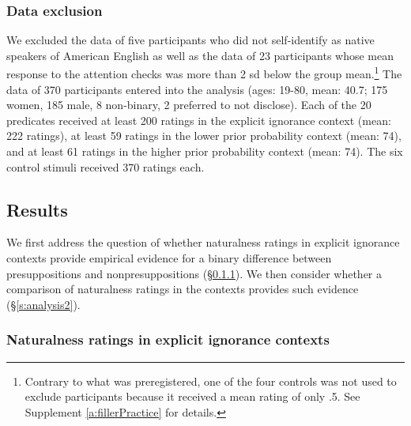 \documentclass[11pt,fleqn]{article}
\newcommand{\6}{\mbox{$[\hspace*{-.6mm}[$}}
\newcommand{\9}{\mbox{$]\hspace*{-.6mm}]$}}
\begin{document}
\subsubsection{Data exclusion} 

We excluded the data of five participants who did not self-identify as native speakers of American English as well as the data of 23 participants whose mean response to the attention checks was more than 2 sd below the group mean.\footnote{Contrary to what was preregistered, one of the four controls was not used to exclude participants because it received a mean rating of only .5. See Supplement \ref{a:fillerPractice} for details.} The data of 370 participants entered into the analysis (ages: 19-80, mean: 40.7; 175 women, 185 male, 8 non-binary, 2 preferred to not disclose). Each of the 20 predicates received at least 200 ratings in the explicit ignorance context (mean: 222 ratings), at least 59 ratings in the lower prior probability context (mean: 74), and at least 61 ratings in the higher prior probability context (mean: 74). The six control stimuli received 370 ratings each. 

\subsection{Results}

We first address the question of whether naturalness ratings in explicit ignorance contexts provide empirical evidence for a binary difference between presuppositions and nonpresuppositions (\S\ref{s:analysis1}). We then consider whether a comparison of naturalness ratings in the contexts provides such evidence (\S\ref{s:analysis2}).

\subsubsection{Naturalness ratings in explicit ignorance contexts}\label{s:analysis1}
\end{document}
